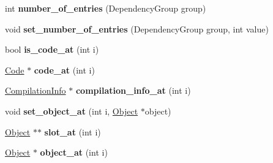 \begin{DoxyCompactItemize}
\item 
\hypertarget{classv8_1_1internal_1_1_dependent_code_a5a4ef9a3583a46c03e72a270ffc4fce6}{}int {\bfseries number\+\_\+of\+\_\+entries} (Dependency\+Group group)\label{classv8_1_1internal_1_1_dependent_code_a5a4ef9a3583a46c03e72a270ffc4fce6}

\item 
\hypertarget{classv8_1_1internal_1_1_dependent_code_aa8a5be522fdba3a6c9ecb72f6018c8d4}{}void {\bfseries set\+\_\+number\+\_\+of\+\_\+entries} (Dependency\+Group group, int value)\label{classv8_1_1internal_1_1_dependent_code_aa8a5be522fdba3a6c9ecb72f6018c8d4}

\item 
\hypertarget{classv8_1_1internal_1_1_dependent_code_a65873fd9ab65e2df9a5b4d30865dd266}{}bool {\bfseries is\+\_\+code\+\_\+at} (int i)\label{classv8_1_1internal_1_1_dependent_code_a65873fd9ab65e2df9a5b4d30865dd266}

\item 
\hypertarget{classv8_1_1internal_1_1_dependent_code_a8bd8ec2159c0acf25ed0e50131693b42}{}\hyperlink{classv8_1_1internal_1_1_code}{Code} $\ast$ {\bfseries code\+\_\+at} (int i)\label{classv8_1_1internal_1_1_dependent_code_a8bd8ec2159c0acf25ed0e50131693b42}

\item 
\hypertarget{classv8_1_1internal_1_1_dependent_code_ae1a8735d60fb77860d2c0f6362f6817c}{}\hyperlink{classv8_1_1internal_1_1_compilation_info}{Compilation\+Info} $\ast$ {\bfseries compilation\+\_\+info\+\_\+at} (int i)\label{classv8_1_1internal_1_1_dependent_code_ae1a8735d60fb77860d2c0f6362f6817c}

\item 
\hypertarget{classv8_1_1internal_1_1_dependent_code_ac608d263f628033461154520d25c2eec}{}void {\bfseries set\+\_\+object\+\_\+at} (int i, \hyperlink{classv8_1_1internal_1_1_object}{Object} $\ast$object)\label{classv8_1_1internal_1_1_dependent_code_ac608d263f628033461154520d25c2eec}

\item 
\hypertarget{classv8_1_1internal_1_1_dependent_code_a5e773c6d8c52cdba6642093a8080fa2f}{}\hyperlink{classv8_1_1internal_1_1_object}{Object} $\ast$$\ast$ {\bfseries slot\+\_\+at} (int i)\label{classv8_1_1internal_1_1_dependent_code_a5e773c6d8c52cdba6642093a8080fa2f}

\item 
\hypertarget{classv8_1_1internal_1_1_dependent_code_a2f04992abf39e020ea6e945e5310230b}{}\hyperlink{classv8_1_1internal_1_1_object}{Object} $\ast$ {\bfseries object\+\_\+at} (int i)\label{classv8_1_1internal_1_1_dependent_code_a2f04992abf39e020ea6e945e5310230b}


\end{DoxyCompactItemize}
